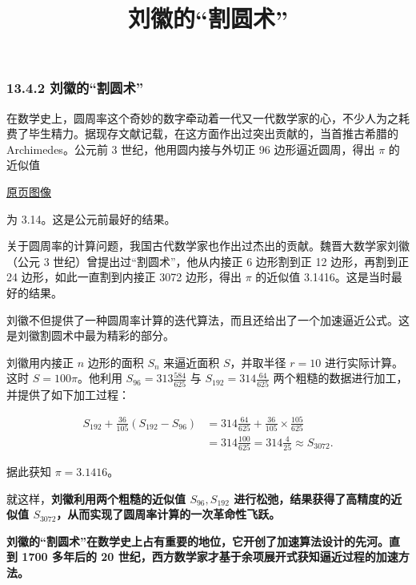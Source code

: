 \documentclass[
  10pt,
  fontset=fandol]{ctexart}
\title{刘徽的``割圆术''}
\author{}
\date{}
\begin{document}
\maketitle

\subsubsection{13.4.2 刘徽的``割圆术''}\label{ux5218ux5fbdux7684ux5272ux5706ux672f}

在数学史上，圆周率这个奇妙的数字牵动着一代又一代数学家的心，不少人为之耗费了毕生精力。据现存文献记载，在这方面作出过突出贡献的，当首推古希腊的 Archimedes。公元前 3 世纪，他用圆内接与外切正 96 边形逼近圆周，得出 \(\pi\) 的近似值

\href{../../source-images/pdf-314.jpeg}{原页图像}

为 3.14。这是公元前最好的结果。

关于圆周率的计算问题，我国古代数学家也作出过杰出的贡献。魏晋大数学家刘徽（公元 3 世纪）曾提出过``割圆术''，他从内接正 6 边形割到正 12 边形，再割到正 24 边形，如此一直割到内接正 3072 边形，得出 \(\pi\) 的近似值 3.1416。这是当时最好的结果。

刘徽不但提供了一种圆周率计算的迭代算法，而且还给出了一个加速逼近公式。这是刘徽割圆术中最为精彩的部分。

刘徽用内接正 \(n\) 边形的面积 \(S_n\) 来逼近面积 \(S\)，并取半径 \(r=10\) 进行实际计算。这时 \(S=100\pi\)。他利用 \(S_{96}=313\frac{584}{625}\) 与 \(S_{192}=314\frac{64}{625}\) 两个粗糙的数据进行加工，并提供了如下加工过程：

\[
\begin{aligned}
S_{192}+\frac{36}{105}(S_{192}-S_{96})
&=314\frac{64}{625}+\frac{36}{105}\times\frac{105}{625}\\
&=314\frac{100}{625}=314\frac{4}{25}\approx S_{3072}.
\end{aligned}
\]

据此获知 \(\pi=3.1416\)。

就这样，\textbf{刘徽利用两个粗糙的近似值 \(S_{96},S_{192}\) 进行松弛，结果获得了高精度的近似值 \(S_{3072}\)，从而实现了圆周率计算的一次革命性飞跃。}

\textbf{刘徽的``割圆术''在数学史上占有重要的地位，它开创了加速算法设计的先河。直到 1700 多年后的 20 世纪，西方数学家才基于余项展开式获知逼近过程的加速方法。}
\end{document}
